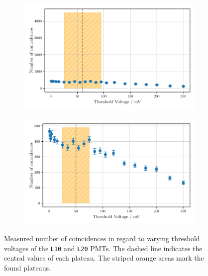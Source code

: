 \begin{figure}
    \centering
    \begin{subfigure}[b]{0.48\textwidth}
        \includegraphics[width=\textwidth]{plots/threshL10_2.pdf}
    \end{subfigure}\hfill
    \begin{subfigure}[b]{0.48\textwidth}
        \includegraphics[width=\textwidth]{plots/threshL20.pdf}
    \end{subfigure}
    \caption{Measured number of coincidences in regard to varying threshold voltages
    of the \texttt{L10} and \texttt{L20} PMTs.
    The dashed line indicates the central values of each plateau. The striped orange areas mark the found plateaus.}
    \label{fig:appthresh5}
\end{figure}
